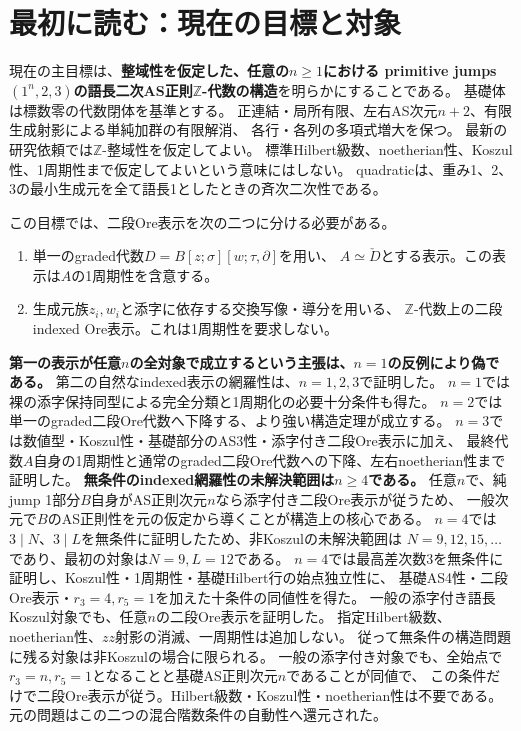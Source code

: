 \documentclass[11pt,a4paper]{ltjsarticle}
\begin{document}
\section{最初に読む：現在の目標と対象}
現在の主目標は、\textbf{整域性を仮定した、任意の$n\geq1$における
primitive jumps $(1^n,2,3)$の語長二次AS正則$\mathbb Z$-代数の構造}を明らかにすることである。
基礎体は標数零の代数閉体を基準とする。
正連結・局所有限、左右AS次元$n+2$、有限生成射影による単純加群の有限解消、
各行・各列の多項式増大を保つ。
最新の研究依頼では$\mathbb Z$-整域性を仮定してよい。
標準Hilbert級数、noetherian性、Koszul性、1周期性まで仮定してよいという意味にはしない。
quadraticは、重み1、2、3の最小生成元を全て語長1としたときの斉次二次性である。

この目標では、二段Ore表示を次の二つに分ける必要がある。
\begin{enumerate}
\item 単一のgraded代数$D=B[z;\sigma][w;\tau,\partial]$を用い、
$A\simeq\check D$とする表示。この表示は$A$の1周期性を含意する。
\item 生成元族$z_i,w_i$と添字に依存する交換写像・導分を用いる、
$\mathbb Z$-代数上の二段indexed Ore表示。これは1周期性を要求しない。
\end{enumerate}
\textbf{第一の表示が任意$n$の全対象で成立するという主張は、$n=1$の反例により偽である。}
第二の自然なindexed表示の網羅性は、$n=1,2,3$で証明した。
$n=1$では裸の添字保持同型による完全分類と1周期化の必要十分条件も得た。
$n=2$では単一のgraded二段Ore代数へ下降する、より強い構造定理が成立する。
$n=3$では数値型・Koszul性・基礎部分のAS3性・添字付き二段Ore表示に加え、
最終代数$A$自身の1周期性と通常のgraded二段Ore代数への下降、左右noetherian性まで証明した。
\textbf{無条件のindexed網羅性の未解決範囲は$n\geq4$である。}
任意$n$で、純jump 1部分$B$自身がAS正則次元$n$なら添字付き二段Ore表示が従うため、
一般次元で$B$のAS正則性を元の仮定から導くことが構造上の核心である。
$n=4$では$3\mid N$、$3\mid L$を無条件に証明したため、非Koszulの未解決範囲は
$N=9,12,15,\ldots$であり、最初の対象は$N=9,L=12$である。
$n=4$では最高差次数3を無条件に証明し、Koszul性・1周期性・基礎Hilbert行の始点独立性に、
基礎AS4性・二段Ore表示・$r_3=4,r_5=1$を加えた十条件の同値性を得た。
一般の添字付き語長Koszul対象でも、任意$n$の二段Ore表示を証明した。
指定Hilbert級数、noetherian性、$zz$射影の消滅、一周期性は追加しない。
従って無条件の構造問題に残る対象は非Koszulの場合に限られる。
一般の添字付き対象でも、全始点で$r_3=n,r_5=1$となることと基礎AS正則次元$n$であることが同値で、
この条件だけで二段Ore表示が従う。Hilbert級数・Koszul性・noetherian性は不要である。
元の問題はこの二つの混合階数条件の自動性へ還元された。
\end{document}
